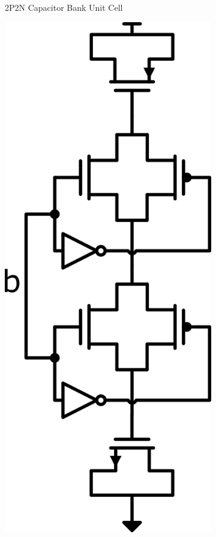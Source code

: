 \begin{figure}[H]
\begin{subfigure}[b]{0.15\linewidth}
    \caption{2P2N Capacitor Bank Unit Cell}
    \label{fig:2P2N_cap}
  \end{subfigure}
  \hfill
  \begin{subfigure}[b]{0.2\linewidth}
    \centering
    \includegraphics[width=\linewidth]{figures/Schematics/Tgate_cap.png}

\end{subfigure}
\end{figure}
